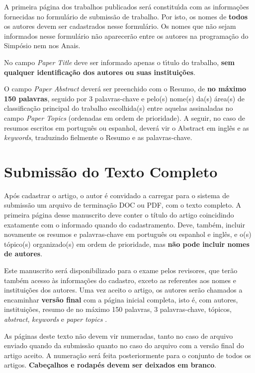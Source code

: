 \documentclass[a4paper,11pt]{article}
\begin{document}
A primeira p\'agina dos trabalhos publicados ser\'a constitu\'\i da com as informa\c c\~oes fornecidas
no formul\'ario de submiss\~ao de trabalho.
Por isto, os nomes de \textbf {todos} os autores devem ser cadastrados nesse formul\'ario.
Os nomes que n\~ao sejam informados nesse formul\'ario n\~ao aparecer\~ao entre os autores
na programa\c c\~ao do Simp\'osio nem nos Anais.


No campo \textit{Paper Title} deve ser informado apenas o t\'\i tulo do trabalho,
\textbf{ sem qualquer identifica\-\c c\~ao dos autores ou suas institui\c c\~oes}.

O campo \textit{Paper Abstract} dever\'a ser preenchido com o Resumo, de \textbf{no m\'aximo 150 palavras},
seguido por 3 palavras-chave e pelo(s) nome(s) da(s) \'area(s) de classifica\c c\~ao principal do trabalho escolhida(s) 
entre aquelas assinaladas no campo \textit{ Paper Topics} (ordenadas em ordem de prioridade). 
A seguir, no caso de resumos escritos em portugu\^es ou espanhol, dever\'a vir o Abstract em ingl\^es
e as \textit{keywords}, traduzindo fielmente o Resumo e as palavras-chave. 


\section{Submiss\~ao do Texto Completo}

Ap\'os cadastrar o artigo, o autor \'e convidado a carregar para o sistema de submiss\~ao um arquivo 
de termina\-\c c\~ao DOC ou PDF, com o texto completo. 
A primeira p\'agina desse manuscrito deve conter o t\'itulo do artigo coincidindo exatamente com o informado quando do cadastramento. 
Deve, tamb\'em, incluir novamente os resumos e palavras-chave em portugu\^es ou espanhol e ingl\^es, e o(s) t\'opico(s) organizado(s) 
em ordem de prioridade, mas \textbf{n\~ao pode incluir nomes de autores}.

Este manuscrito ser\'a disponibilizado para o exame pelos revisores, que ter\~ao tamb\'em acesso
 \`as informa\c c\~oes do cadastro, exceto as referentes aos nomes e institui\c c\~oes dos autores. 
Uma vez aceito o artigo, os autores ser\~ao chamados a encaminhar \textbf{vers\~ao final} com a p\'agina inicial completa, isto \'e, com autores, institui\c c\~oes, resumo de no m\'aximo 150 palavras, 3 palavras-chave, t\'opicos, \textit{abstract}, \textit{keywords} e \textit{paper topics} .

As p\'aginas deste texto n\~ao devem vir numeradas, tanto no caso de arquivo enviado quando da submiss\~ao quanto no caso do arquivo com a vers\~ao final do artigo aceito. 
A numera\c c\~ao ser\'a feita posteriormente para o conjunto de todos os artigos.
\textbf{Cabe\c calhos e rodap\'es devem ser deixados em branco}.
\end{document}

